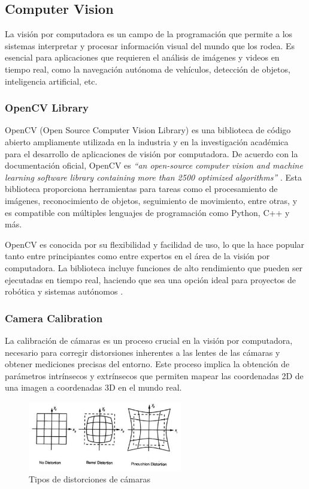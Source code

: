 \subsection{Computer Vision}
    

    La visión por computadora es un campo de la programación que permite a los sistemas interpretar y procesar información visual del mundo que los rodea. Es esencial para aplicaciones que requieren el análisis de imágenes y videos en tiempo real, como la navegación autónoma de vehículos, detección de objetos, inteligencia artificial, etc.

    \subsubsection{OpenCV Library}

    OpenCV (Open Source Computer Vision Library) es una biblioteca de código abierto ampliamente utilizada en la industria y en la investigación académica para el desarrollo de aplicaciones de visión por computadora. De acuerdo con la documentación oficial, OpenCV es \textit{“an open-source computer vision and machine learning software library containing more than 2500 optimized algorithms”} \cite{opencv_docs}. Esta biblioteca proporciona herramientas para tareas como el procesamiento de imágenes, reconocimiento de objetos, seguimiento de movimiento, entre otras, y es compatible con múltiples lenguajes de programación como Python, C++ y más.

    OpenCV es conocida por su flexibilidad y facilidad de uso, lo que la hace popular tanto entre principiantes como entre expertos en el área de la visión por computadora. La biblioteca incluye funciones de alto rendimiento que pueden ser ejecutadas en tiempo real, haciendo que sea una opción ideal para proyectos de robótica y sistemas autónomos \cite{arevalo2004}.

    \subsubsection{Camera Calibration}

    La calibración de cámaras es un proceso crucial en la visión por computadora, necesario para corregir distorsiones inherentes a las lentes de las cámaras y obtener mediciones precisas del entorno. Este proceso implica la obtención de parámetros intrínsecos y extrínsecos que permiten mapear las coordenadas 2D de una imagen a coordenadas 3D en el mundo real.

    \begin{figure}[h!] 
    \centering 
    \includegraphics[width=0.6\textwidth]{pictures/distortions.png} %
    \caption{Tipos de distorciones de cámaras}
    \label{fig} 
    \end{figure}

